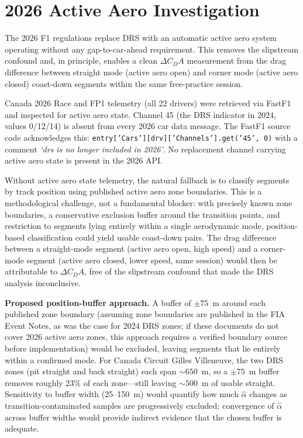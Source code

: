\section{2026 Active Aero Investigation}
\label{sec: 2026 Active Aero Investigation}

The 2026 F1 regulations\cite{2026_FIA_regs} replace DRS with an automatic active aero system operating without any gap-to-car-ahead requirement. This removes the slipstream confound and, in principle, enables a clean $\Delta C_DA$ measurement from the drag difference between straight mode (active aero open) and corner mode (active aero closed) coast-down segments within the same free-practice session.

Canada 2026 Race and FP1 telemetry (all 22 drivers) were retrieved via FastF1 and inspected for active aero state. Channel 45 (the DRS indicator in 2024, values 0/12/14) is absent from every 2026 car data message. The FastF1 source code acknowledges this: \texttt{entry['Cars'][drv]['Channels'].get('45',\,0)} with a comment \textit{`drs is no longer included in 2026'}. No replacement channel carrying active aero state is present in the 2026 API.

Without active aero state telemetry, the natural fallback is to classify segments by track position using published active aero zone boundaries. This is a methodological challenge, not a fundamental blocker: with precisely known zone boundaries, a conservative exclusion buffer around the transition points, and restriction to segments lying entirely within a single aerodynamic mode, position-based classification could yield usable coast-down pairs. The drag difference between a straight-mode segment (active aero open, high speed) and a corner-mode segment (active aero closed, lower speed, same session) would then be attributable to $\Delta C_DA$, free of the slipstream confound that made the DRS analysis inconclusive.

\textbf{Proposed position-buffer approach.} A buffer of $\pm 75$~m around each published zone boundary (assuming zone boundaries are published in the FIA Event Notes, as was the case for 2024 DRS zones; if these documents do not cover 2026 active aero zones, this approach requires a verified boundary source before implementation) would be excluded, leaving segments that lie entirely within a confirmed mode. For Canada Circuit Gilles Villeneuve, the two DRS zones (pit straight and back straight) each span $\sim\!650$~m, so a $\pm 75$~m buffer removes roughly 23\% of each zone---still leaving $\sim\!500$~m of usable straight. Sensitivity to buffer width (25--150~m) would quantify how much $\hat{\alpha}$ changes as transition-contaminated samples are progressively excluded; convergence of $\hat{\alpha}$ across buffer widths would provide indirect evidence that the chosen buffer is adequate.

